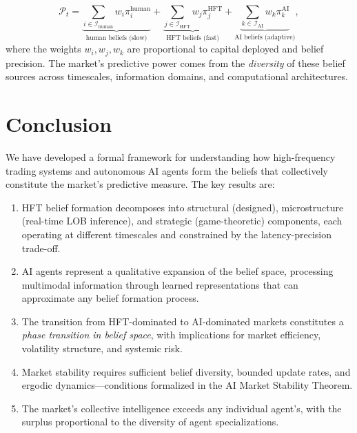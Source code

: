 \documentclass[12pt,a4paper]{article}
\theoremstyle{definition}
\newcommand{\PP}{\mathcal{P}}
\begin{document}
\begin{equation}\label{eq:complete-hierarchy}
  \PP_t = \underbrace{\sum_{i \in \mathcal{I}_{\mathrm{human}}} w_i \pi_i^{\mathrm{human}}}_{\text{human beliefs (slow)}} + \underbrace{\sum_{j \in \mathcal{I}_{\mathrm{HFT}}} w_j \pi_j^{\mathrm{HFT}}}_{\text{HFT beliefs (fast)}} + \underbrace{\sum_{k \in \mathcal{I}_{\mathrm{AI}}} w_k \pi_k^{\mathrm{AI}}}_{\text{AI beliefs (adaptive)}},
\end{equation}
where the weights $w_i, w_j, w_k$ are proportional to capital deployed and belief precision. The market's predictive power comes from the \emph{diversity} of these belief sources across timescales, information domains, and computational architectures.

\section{Conclusion}\label{sec:conclusion}

We have developed a formal framework for understanding how high-frequency trading systems and autonomous AI agents form the beliefs that collectively constitute the market's predictive measure. The key results are:

\begin{enumerate}
  \item HFT belief formation decomposes into structural (designed), microstructure (real-time LOB inference), and strategic (game-theoretic) components, each operating at different timescales and constrained by the latency-precision trade-off.

  \item AI agents represent a qualitative expansion of the belief space, processing multimodal information through learned representations that can approximate any belief formation process.

  \item The transition from HFT-dominated to AI-dominated markets constitutes a \emph{phase transition in belief space}, with implications for market efficiency, volatility structure, and systemic risk.

  \item Market stability requires sufficient belief diversity, bounded update rates, and ergodic dynamics---conditions formalized in the AI Market Stability Theorem.

  \item The market's collective intelligence exceeds any individual agent's, with the surplus proportional to the diversity of agent specializations.
\end{enumerate}
\end{document}
